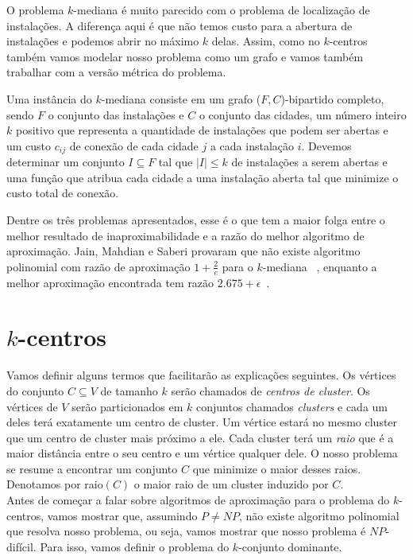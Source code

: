 \documentclass[12pt]{article}
\newcommand{\NP}{\mathit{NP}}
\begin{document}
O problema $k$-mediana é muito parecido com o problema de localização de instalações. A diferença aqui é que não temos custo para a abertura de instalações e podemos abrir no máximo $k$ delas. Assim, como no $k$-centros também vamos modelar nosso problema como um grafo e vamos também trabalhar com a versão métrica do problema.

Uma instância do $k$-mediana consiste em um grafo ($F,C$)-bipartido completo, sendo $F$ o conjunto das instalações e $C$ o conjunto das cidades, um número inteiro $k$ positivo que representa a quantidade de instalações que podem ser abertas e um custo $c_{ij}$ de conexão de cada cidade $j$ a cada instalação $i$. Devemos determinar um conjunto $I \subseteq F$ tal que $|I| \leq k$ de instalações a serem abertas e uma função que atribua cada cidade a uma instalação aberta tal que minimize o custo total de conexão.

Dentre os três problemas apresentados, esse é o que tem a maior folga entre o melhor resultado de inaproximabilidade e a razão do melhor algoritmo de aproximação. Jain, Mahdian e Saberi provaram que não existe algoritmo polinomial com razão de aproximação $1+ \frac{2}{e}$ para o $k$-mediana ~\cite{JMS'02}, enquanto a melhor aproximação encontrada tem razão $2.675 + \epsilon$~\cite{BPRST'17}.

\newpage
\section{$k$-centros}

Vamos definir alguns termos que facilitarão as explicações seguintes. Os vértices do conjunto $C \subseteq V$ de tamanho $k$ serão chamados de \emph{centros de cluster}. Os vértices de $V$ serão particionados em $k$ conjuntos chamados \emph{clusters} e cada um deles terá exatamente um centro de cluster. Um vértice estará no mesmo cluster que um centro de cluster mais próximo a ele. Cada cluster terá um \emph{raio} que é a maior distância entre o seu centro e um vértice qualquer dele. O nosso problema se resume a encontrar um conjunto $C$ que minimize o maior desses raios. Denotamos por raio$(C)$ o maior raio de um cluster induzido por $C$.\\
Antes de começar a falar sobre algoritmos de aproximação para o problema do $k$-centros, vamos mostrar que, assumindo $P\not=\NP$, não existe algoritmo polinomial que resolva nosso problema, ou seja, vamos mostrar que nosso problema é $\NP$-difícil. Para isso, vamos definir o problema do $k$-conjunto dominante.
\end{document}
